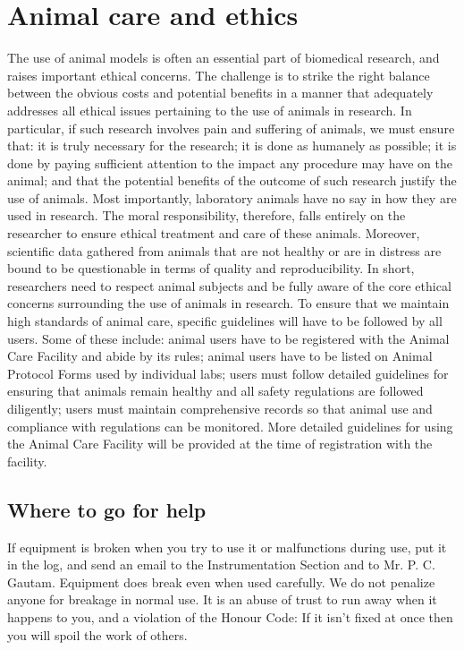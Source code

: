\documentclass[a4paper,10pt]{article}
\begin{document}
\section{Animal care and ethics}
The use of animal models is often an essential part of biomedical
research, and raises important ethical concerns. The challenge is to strike the right balance
between the obvious costs and potential benefits in a manner that adequately addresses all
ethical issues pertaining to the use of animals in research. In particular, if such research
involves pain and suffering of animals, we must ensure that: it is truly necessary for the
research; it is done as humanely as possible; it is done by paying sufficient attention to the
impact any procedure may have on the animal; and that the potential benefits of the outcome
of such research justify the use of animals. Most importantly, laboratory animals have no
say in how they are used in research. The moral responsibility, therefore, falls entirely on the
researcher to ensure ethical treatment and care of these animals. Moreover, scientific data
gathered from animals that are not healthy or are in distress are bound to be questionable in
terms of quality and reproducibility. In short, researchers need to respect animal subjects
and be fully aware of the core ethical concerns surrounding the use of animals in research.
To ensure that we maintain high standards of animal care, specific guidelines will have to be
followed by all users. Some of these include: animal users have to be registered with the
Animal Care Facility and abide by its rules; animal users have to be listed on Animal
Protocol Forms used by individual labs; users must follow detailed guidelines for ensuring
that animals remain healthy and all safety regulations are followed diligently; users must
maintain comprehensive records so that animal use and compliance with regulations can be
monitored. More detailed guidelines for using the Animal Care Facility will be provided at
the time of registration with the facility.

\subsection{Where to go for help}
If equipment is broken when you try to use it or malfunctions during
use, put it in the log, and send an email to the Instrumentation Section and to Mr. P. C.
Gautam. Equipment does break even when used carefully. We do not penalize anyone for
breakage in normal use. It is an abuse of trust to run away when it happens to you, and a
violation of the Honour Code: If it isn't fixed at once then you will spoil the work of others.
\end{document}
